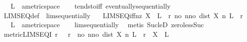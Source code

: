 \begin{isabellebody}
\ \ \ L\ {\isacharcolon}{\kern0pt}{\isacharcolon}{\kern0pt}\ {\isachardoublequoteopen}{\isacharprime}{\kern0pt}a{\isacharcolon}{\kern0pt}{\isacharcolon}{\kern0pt}metric{\isacharunderscore}{\kern0pt}space{\isachardoublequoteclose}\isanewline
%
\isadelimproof
\ \ %
\endisadelimproof
%
\isatagproof
{}\isamarkupfalse%
\ tendsto{\isacharunderscore}{\kern0pt}iff\ eventually{\isacharunderscore}{\kern0pt}sequentially\ \isacommand{{\isachardot}{\kern0pt}{\isachardot}{\kern0pt}}\isamarkupfalse%
%
\endisatagproof
{\isafoldproof}%
%
\isadelimproof
\isanewline
%
\endisadelimproof
\isanewline
{}\isamarkupfalse%
\ LIMSEQ{\isacharunderscore}{\kern0pt}def\ {\isacharequal}{\kern0pt}\ lim{\isacharunderscore}{\kern0pt}sequentially\ \ \isanewline
\isanewline
{}\isamarkupfalse%
\ LIMSEQ{\isacharunderscore}{\kern0pt}iff{\isacharunderscore}{\kern0pt}nz{\isacharcolon}{\kern0pt}\ {\isachardoublequoteopen}X\ {\isasymlonglonglongrightarrow}\ L\ {\isasymlongleftrightarrow}\ {\isacharparenleft}{\kern0pt}{\isasymforall}r{\isachargreater}{\kern0pt}{}{\isachardot}{\kern0pt}\ {\isasymexists}no{\isachargreater}{\kern0pt}{}{\isachardot}{\kern0pt}\ {\isasymforall}n{\isasymge}no{\isachardot}{\kern0pt}\ dist\ {\isacharparenleft}{\kern0pt}X\ n{\isacharparenright}{\kern0pt}\ L\ {\isacharless}{\kern0pt}\ r{\isacharparenright}{\kern0pt}{\isachardoublequoteclose}\isanewline
\ \ \ L\ {\isacharcolon}{\kern0pt}{\isacharcolon}{\kern0pt}\ {\isachardoublequoteopen}{\isacharprime}{\kern0pt}a{\isacharcolon}{\kern0pt}{\isacharcolon}{\kern0pt}metric{\isacharunderscore}{\kern0pt}space{\isachardoublequoteclose}\isanewline
%
\isadelimproof
\ \ %
\endisadelimproof
%
\isatagproof
{}\isamarkupfalse%
\ lim{\isacharunderscore}{\kern0pt}sequentially\ \isamarkupfalse%
\ {\isacharparenleft}{\kern0pt}metis\ Suc{\isacharunderscore}{\kern0pt}leD\ zero{\isacharunderscore}{\kern0pt}less{\isacharunderscore}{\kern0pt}Suc{\isacharparenright}{\kern0pt}%
\endisatagproof
{\isafoldproof}%
%
\isadelimproof
\isanewline
%
\endisadelimproof
\isanewline
{}\isamarkupfalse%
\ metric{\isacharunderscore}{\kern0pt}LIMSEQ{\isacharunderscore}{\kern0pt}I{\isacharcolon}{\kern0pt}\ {\isachardoublequoteopen}{\isacharparenleft}{\kern0pt}{\isasymAnd}r{\isachardot}{\kern0pt}\ {}\ {\isacharless}{\kern0pt}\ r\ {\isasymLongrightarrow}\ {\isasymexists}no{\isachardot}{\kern0pt}\ {\isasymforall}n{\isasymge}no{\isachardot}{\kern0pt}\ dist\ {\isacharparenleft}{\kern0pt}X\ n{\isacharparenright}{\kern0pt}\ L\ {\isacharless}{\kern0pt}\ r{\isacharparenright}{\kern0pt}\ {\isasymLongrightarrow}\ X\ {\isasymlonglonglongrightarrow}\ L{\isachardoublequoteclose}\isanewline

\end{isabellebody}
